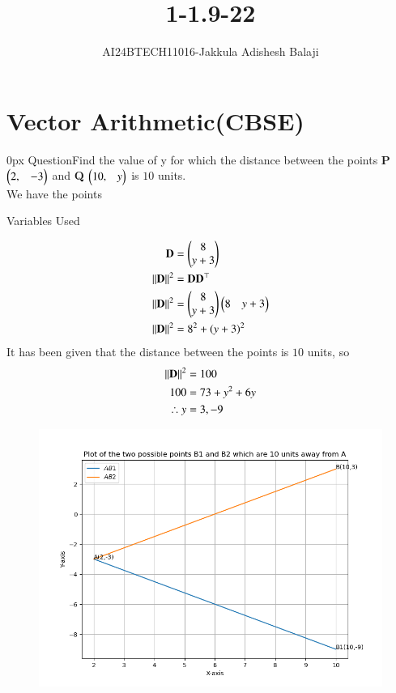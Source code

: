 \documentclass[journal]{IEEEtran}
\begin{document}

\renewcommand{\thefigure}{\theenumi}
\renewcommand{\thetable}{\theenumi}
\setlength{\intextsep}{10pt} %
\renewcommand{\thetable}{\theenumi}
\title{1-1.9-22}

\author{AI24BTECH11016-Jakkula Adishesh Balaji}
\maketitle
\bigskip
\section*{\textbf{Vector Arithmetic(CBSE)}}
         \parindent 0px
         QuestionFind the value of y for which the distance between the points \textbf{P} $\begin{pmatrix}2,&-3\end{pmatrix}$ and \textbf{Q} $\begin{pmatrix}10,&y\end{pmatrix}$ is $10$ units. \\
	\solution We have the points \\
	\begin{table}[h!]
         	\centering
         	
         	\caption{Variables Used}
         	\label{tab1.9.22}
         \end{table}
         \begin{align}
         	\mathbf{D}	&= \begin{pmatrix}8\\y+3\end{pmatrix} \\
		\left\lVert\mathbf{D}\right\rVert^2 &= \mathbf{D}\mathbf{D}^\top \\
		\left\lVert\mathbf{D}\right\rVert^2 &= \begin{pmatrix}8\\y+3\end{pmatrix}\begin{pmatrix}8 & y+3\end{pmatrix} \\
		\left\lVert\mathbf{D}\right\rVert^2 &= 8^{2} + \left(y+3\right)^{2} \\
	\end{align}
	It has been given that the distance between the points is $10$ units, so \\
	\begin{align}
	\left\lVert\mathbf{D}\right\rVert^2 &= 100 	 \\
       	100 &= 73 + y^{2} + 6y \\
 	\therefore y &= 3,-9 \\
	\end{align}
	\begin{figure}[h]
		\centering
		\includegraphics[scale=0.6]{figs/plot.png}
		\label{Fig}
	\end{figure}
\end{document}
